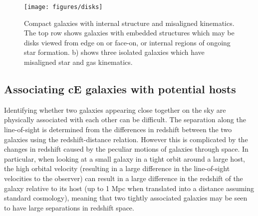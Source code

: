 \documentclass[a4paper,fleqn,usenatbib]{mnras}
\begin{document}
\begin{figure*}
\texttt{[image: figures/disks]}
   \caption{Compact galaxies with internal structure and misaligned kinematics. The top row shows galaxies with embedded structures which may be disks viewed from edge on or face-on, or internal regions of ongoing star formation. b) shows three isolated galaxies which have misaligned star and gas kinematics. }
 \label{disks}
 \end{figure*}
 
 

\subsection{Associating cE galaxies with potential hosts}

Identifying whether two galaxies appearing close together on the sky are physically associated with each other can be difficult. The separation along the line-of-sight is determined from the differences in redshift between the two galaxies using the redshift-distance relation. However this is complicated by the changes in redshift caused by the peculiar motions of galaxies through space. In particular, when looking at a small galaxy in a tight orbit around a large host, the high orbital velocity (resulting in a large difference in the line-of-sight velocities to the observer) can result in a large difference in the redshift of the galaxy relative to its host (up to 1 Mpc when translated into a distance assuming standard cosmology), meaning that two tightly associated galaxies may be seen to have large separations in redshift space. 
\end{document}
